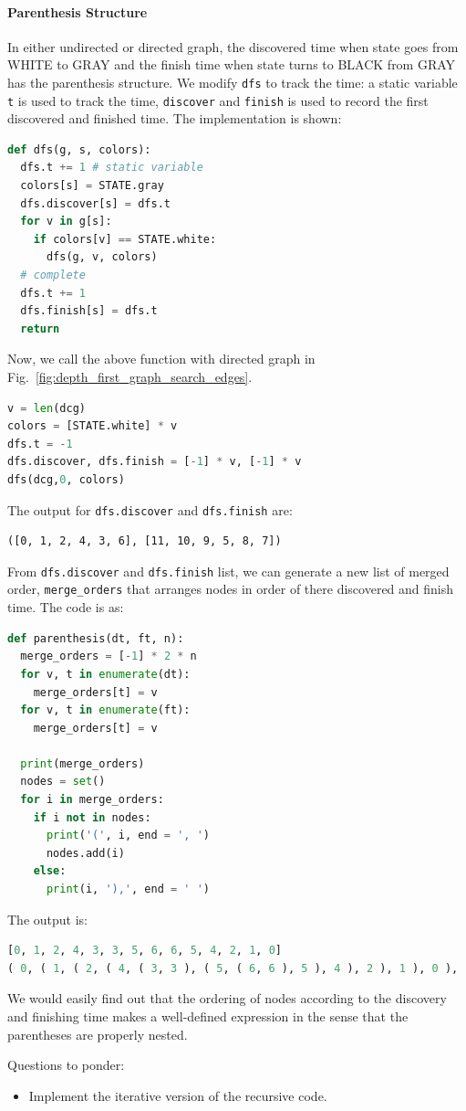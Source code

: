 \documentclass[main.tex]{subfiles}
\begin{document}
\paragraph{Parenthesis Structure} In either undirected or directed graph, the discovered time when state goes from WHITE to GRAY and the finish time  when state turns to BLACK from GRAY has the parenthesis structure. We modify \texttt{dfs} to track the time:  a static variable \texttt{t} is used to track the time, \texttt{discover} and \texttt{finish} is used to record the first discovered and finished time. The implementation is shown:
\begin{lstlisting}[language=Python]
def dfs(g, s, colors):
  dfs.t += 1 # static variable
  colors[s] = STATE.gray
  dfs.discover[s] = dfs.t
  for v in g[s]:
    if colors[v] == STATE.white:
      dfs(g, v, colors)
  # complete
  dfs.t += 1
  dfs.finish[s] = dfs.t
  return
\end{lstlisting}
Now, we call the above function with directed graph in Fig.~\ref{fig:depth_first_graph_search_edges}.
\begin{lstlisting}[language=Python]
v = len(dcg)
colors = [STATE.white] * v
dfs.t = -1
dfs.discover, dfs.finish = [-1] * v, [-1] * v
dfs(dcg,0, colors)
\end{lstlisting}
The output for \texttt{dfs.discover} and \texttt{dfs.finish} are:
\begin{lstlisting}[numbers=none]
([0, 1, 2, 4, 3, 6], [11, 10, 9, 5, 8, 7])
\end{lstlisting}
From \texttt{dfs.discover} and \texttt{dfs.finish} list, we can generate a new list of merged order, \texttt{merge\_orders} that arranges nodes in order of there discovered and finish time. The code is as:
\begin{lstlisting}[language=Python]
def parenthesis(dt, ft, n):
  merge_orders = [-1] * 2 * n
  for v, t in enumerate(dt):
    merge_orders[t] = v
  for v, t in enumerate(ft):
    merge_orders[t] = v

  print(merge_orders)
  nodes = set()
  for i in merge_orders:
    if i not in nodes:
      print('(', i, end = ', ')
      nodes.add(i)
    else:
      print(i, '),', end = ' ')
\end{lstlisting}
The output is:
\begin{lstlisting}[language=Python]
[0, 1, 2, 4, 3, 3, 5, 6, 6, 5, 4, 2, 1, 0]
( 0, ( 1, ( 2, ( 4, ( 3, 3 ), ( 5, ( 6, 6 ), 5 ), 4 ), 2 ), 1 ), 0 ), 
\end{lstlisting}
We would easily find out that the ordering of nodes according to the discovery and finishing time makes a well-defined expression in the sense that the parentheses are properly nested.
\begin{bclogo}[couleur = blue!30, arrondi=0.1,logo=\bccrayon,ombre=true]{Questions to ponder: } 
\begin{itemize}
\item Implement the iterative version of the recursive code.
\end{itemize}
\end{bclogo}
\end{document}
